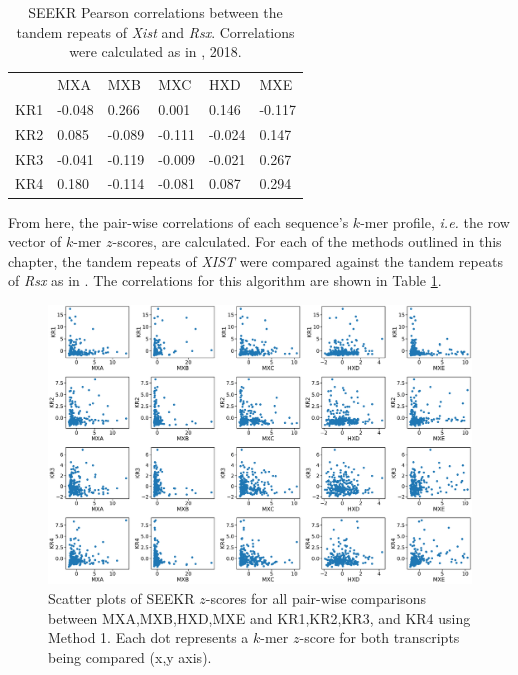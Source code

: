 \begin{table}[ht]
\begin{center}
\begin{tabular}{llllll}
&MXA & MXB                   & MXC                  & HXD                   & MXE                                         \\
KR1 & -0.048 & 0.266   & 0.001 & 0.146    & -0.117 \\
KR2 & 0.085   & -0.089  & -0.111  & -0.024 & 0.147  \\
KR3 & -0.041 & -0.119   & -0.009 & -0.021 & 0.267   \\
KR4 & 0.180   & -0.114 & -0.081  & 0.087   & 0.294 
\end{tabular}
\caption[Kirk et al. $k$-mer counting]{SEEKR Pearson correlations between the tandem repeats of \emph{Xist} and \emph{Rsx}. Correlations were calculated as in \cite{Kirk2018FunctionalContent}, 2018.}
\label{tbl:kmers1}

\end{center}
\end{table}

From here, the pair-wise correlations of each sequence's $k$-mer profile, \emph{i.e.} the row vector of $k$-mer $z$-scores, are calculated. For each of the methods outlined in this chapter, the tandem repeats of \emph{XIST} were compared against the tandem repeats of \emph{Rsx} as in \cite{Sprague2019NonlinearDomains}. The correlations for this algorithm are shown in Table \ref{tbl:kmers1}.

\begin{figure}[h]
\centering
\includegraphics[width=.9\textwidth]{images/natgen.pdf}
\caption[Kirk et al. $k$-mer counting $z$-score scatter plots]{Scatter plots of SEEKR $z$-scores for all pair-wise comparisons between MXA,MXB,HXD,MXE and KR1,KR2,KR3, and KR4 using Method 1. Each dot represents a $k$-mer $z$-score for both transcripts being compared (x,y axis).}
\label{fig:natgenscat}
\end{figure}

